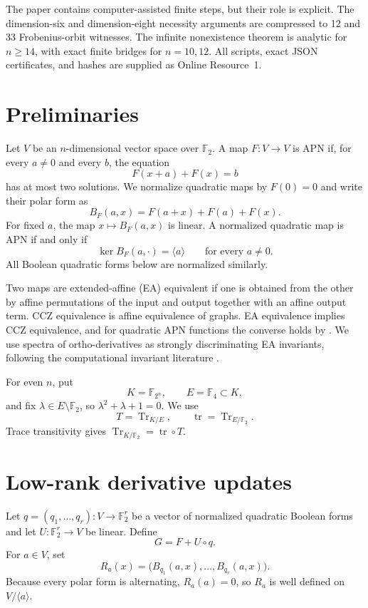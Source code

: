 \documentclass[pdflatex,sn-mathphys-num]{sn-jnl}
\theoremstyle{thmstyleone}
\theoremstyle{thmstyletwo}
\theoremstyle{thmstylethree}
\newcommand{\F}{\mathbb F}
\newcommand{\Tr}{\operatorname{Tr}}
\newcommand{\tr}{\operatorname{tr}}
\begin{document}
The paper contains computer-assisted finite steps, but their role is explicit.  The dimension-six and dimension-eight necessity arguments are compressed to 12 and 33 Frobenius-orbit witnesses.  The infinite nonexistence theorem is analytic for $n\geq14$, with exact finite bridges for $n=10,12$.  All scripts, exact JSON certificates, and hashes are supplied as Online Resource~1.

\section{Preliminaries}\label{sec:prelim}

Let $V$ be an $n$-dimensional vector space over $\F_2$.  A map $F:V\to V$ is APN if, for every $a\ne0$ and every $b$, the equation
\[
 F(x+a)+F(x)=b
\]
has at most two solutions.  We normalize quadratic maps by $F(0)=0$ and write their polar form as
\[
 B_F(a,x)=F(a+x)+F(a)+F(x).
\]
For fixed $a$, the map $x\mapsto B_F(a,x)$ is linear.  A normalized quadratic map is APN if and only if
\begin{equation}\label{eq:polar-apn}
 \ker B_F(a,\cdot)=\langle a\rangle
 \qquad\text{for every }a\ne0.
\end{equation}
All Boolean quadratic forms below are normalized similarly.

Two maps are extended-affine (EA) equivalent if one is obtained from the other by affine permutations of the input and output together with an affine output term.  CCZ equivalence is affine equivalence of graphs.  EA equivalence implies CCZ equivalence, and for quadratic APN functions the converse holds by \cite{Yoshiara2012}.  We use spectra of ortho-derivatives as strongly discriminating EA invariants, following the computational invariant literature \cite{Kaleyski2021,BeierleLeanderPerrin2022}.

For even $n$, put
\[
 K=\F_{2^n},\qquad E=\F_4\subset K,
\]
and fix $\lambda\in E\setminus\F_2$, so $\lambda^2+\lambda+1=0$.  We use
\[
 T=\Tr_{K/E},\qquad \tr=\Tr_{E/\F_2}.
\]
Trace transitivity gives $\Tr_{K/\F_2}=\tr\circ T$.

\section{Low-rank derivative updates}\label{sec:lowrank}

Let $q=(q_1,\ldots,q_r):V\to\F_2^r$ be a vector of normalized quadratic Boolean forms and let $U:\F_2^r\to V$ be linear.  Define
\[
 G=F+U\circ q.
\]
For $a\in V$, set
\[
 R_a(x)=\bigl(B_{q_1}(a,x),\ldots,B_{q_r}(a,x)\bigr).
\]
Because every polar form is alternating, $R_a(a)=0$, so $R_a$ is well defined on $V/\langle a\rangle$.
\end{document}
